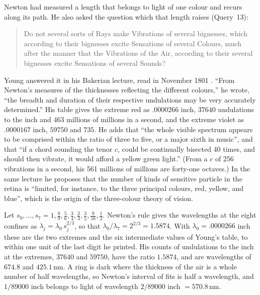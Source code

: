 \documentclass[11pt]{article}
\begin{document}
Newton had measured a length that belongs to light of one colour and recurs along its path.
He also asked the question which that length raises (Query~13):
\begin{quote}
Do not several sorts of Rays make Vibrations of several bignesses, which according to their bignesses excite Sensations of several Colours, much after the manner that the Vibrations of the Air, according to their several bignesses excite Sensations of several Sounds?
\end{quote}
Young answered it in his Bakerian lecture, read in November 1801 \cite{Young}.
``From Newton's measures of the thicknesses reflecting the different colours,'' he wrote, ``the breadth and duration of their respective undulations may be very accurately determined.''
His table gives the extreme red as $.0000266$ inch, $37640$ undulations to the inch and $463$ millions of millions in a second, and the extreme violet as $.0000167$ inch, $59750$ and $735$.
He adds that ``the whole visible spectrum appears to be comprised within the ratio of three to five, or a major sixth in music'', and that ``if a chord sounding the tenor $c$, could be continually bisected 40 times, and should then vibrate, it would afford a yellow green light.''
(From a $c$ of 256 vibrations in a second, his 561 millions of millions are forty-one octaves.)
In the same lecture he proposes that the number of kinds of sensitive particle in the retina is ``limited, for instance, to the three principal colours, red, yellow, and blue'', which is the origin of the three-colour theory of vision.

\begin{derivation}\label{d:newton}
Let $s_0,\dots,s_7 = 1, \tfrac89, \tfrac56, \tfrac34, \tfrac23, \tfrac35, \tfrac9{16}, \tfrac12$.
Newton's rule gives the wavelengths at the eight confines as $\lambda_j = \lambda_0\,s_j^{2/3}$, so that $\lambda_0/\lambda_7 = 2^{2/3} = 1.5874$.
With $\lambda_0 = .0000266$ inch these are the two extremes and the six intermediate values of Young's table, to within one unit of the last digit he printed.
His counts of undulations to the inch at the extremes, $37640$ and $59750$, have the ratio $1.5874$, and are wavelengths of $674.8$ and $425.1$\,nm.
A ring is dark where the thickness of the air is a whole number of half wavelengths, so Newton's interval of fits is half a wavelength, and $1/89000$ inch belongs to light of wavelength $2/89000$ inch $= 570.8$\,nm.
\end{derivation}
\end{document}

